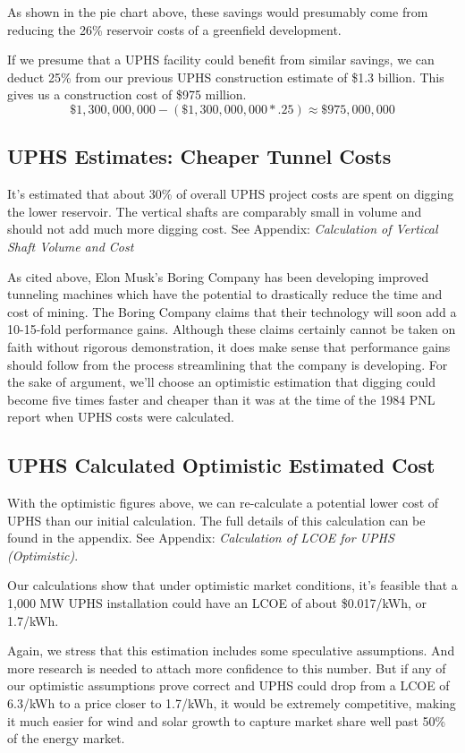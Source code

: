 \documentclass[hidelinks,12pt,a4paper]{article}
\begin{document}
As shown in the pie chart above, these savings would presumably come from reducing the 26\% reservoir costs of a greenfield development.

If we presume that a UPHS facility could benefit from similar savings, we can deduct 25\% from our previous UPHS construction estimate of \$1.3 billion. This gives us a construction cost of \$975 million.
\[ \$1,300,000,000 - (\$1,300,000,000 * .25) \approx \$975,000,000\]

\subsection{UPHS Estimates: Cheaper Tunnel Costs}
It's estimated that about 30\% of overall UPHS project costs are spent on digging the lower reservoir. The vertical shafts are comparably small in volume and should not add much more digging cost. See Appendix: \textit{Calculation of Vertical Shaft Volume and Cost}

As cited above, Elon Musk's Boring Company has been developing improved tunneling machines which have the potential to drastically reduce the time and cost of mining. The Boring Company claims that their technology will soon add a 10-15-fold performance gains. Although these claims certainly cannot be taken on faith without rigorous demonstration, it does make sense that performance gains should follow from the process streamlining that the company is developing. For the sake of argument, we'll choose an optimistic estimation that digging could become five times faster and cheaper than it was at the time of the 1984 PNL report when UPHS costs were calculated.

\subsection{UPHS Calculated Optimistic Estimated Cost}
With the optimistic figures above, we can re-calculate a potential lower cost of UPHS than our initial calculation. The full details of this calculation can be found in the appendix. See Appendix: \textit{Calculation of LCOE for UPHS (Optimistic)}.

\begin{displayquote}
Our calculations show that under optimistic market conditions, it's feasible that a 1,000 MW UPHS installation could have an LCOE of about \$0.017/kWh, or 1.7\cent /kWh.
\end{displayquote}

Again, we stress that this estimation includes some speculative assumptions. And more research is needed to attach more confidence to this number. But if any of our optimistic assumptions prove correct and UPHS could drop from a LCOE of 6.3\cent /kWh to a price closer to 1.7\cent /kWh, it would be extremely competitive, making it much easier for wind and solar growth to capture market share well past 50\% of the energy market.
\end{document}
